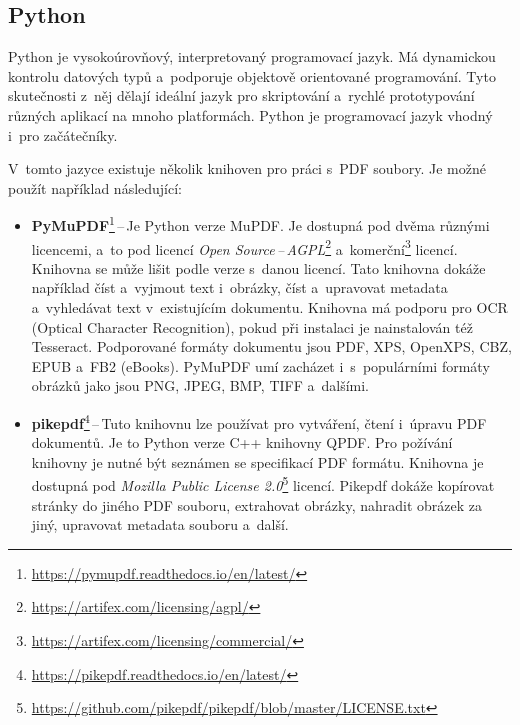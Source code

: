 \subsection*{Python}

Python je vysokoúrovňový, interpretovaný programovací jazyk. Má dynamickou
kontrolu datových typů a~podporuje objektově orientované programování. Tyto
skutečnosti z~něj dělají ideální jazyk pro skriptování a~rychlé prototypování
různých aplikací na mnoho platformách. Python je programovací jazyk vhodný i~pro
začátečníky.
\cite{Python}

V~tomto jazyce existuje několik knihoven pro práci s~PDF soubory. Je možné použít
například následující: 
\begin{itemize}
    \item \textbf{PyMuPDF}\footnote{
    \href{https://pymupdf.readthedocs.io/en/latest/}{https://pymupdf.readthedocs.io/en/latest/}
    }\,--\,Je Python verze MuPDF. Je dostupná pod dvěma různými licencemi, a~to pod
    licencí \emph{Open Source\,--\,AGPL}\footnote{
    \href{https://artifex.com/licensing/agpl/}{https://artifex.com/licensing/agpl/}
    } a~komerční\footnote{
    \href{https://artifex.com/licensing/commercial/}{https://artifex.com/licensing/commercial/}
    } licencí. Knihovna se může lišit podle verze s~danou licencí. Tato knihovna
    dokáže například číst a~vyjmout text i~obrázky, číst a~upravovat
    metadata a~vyhledávat text v~existujícím dokumentu.
    Knihovna má podporu pro OCR (Optical Character Recognition), pokud při
    instalaci je nainstalován též Tesseract. Podporované formáty dokumentu jsou
    PDF, XPS, OpenXPS, CBZ, EPUB a~FB2 (eBooks). PyMuPDF umí zacházet
    i~s~populárními formáty obrázků jako jsou PNG, JPEG, BMP, TIFF a~dalšími.

    \item \textbf{pikepdf}\footnote{
    \href{https://pikepdf.readthedocs.io/en/latest/}{https://pikepdf.readthedocs.io/en/latest/}
    }\,--\,Tuto knihovnu lze používat pro vytváření, čtení i~úpravu PDF dokumentů.
    Je to Python verze C++ knihovny QPDF. Pro požívání knihovny je nutné být
    seznámen se specifikací PDF formátu. Knihovna je dostupná pod
    \emph{Mozilla Public License 2.0}\footnote{
    \href{https://github.com/pikepdf/pikepdf/blob/master/LICENSE.txt}{https://github.com/pikepdf/pikepdf/blob/master/LICENSE.txt}
    } licencí. Pikepdf dokáže kopírovat stránky do jiného PDF souboru, extrahovat
    obrázky, nahradit obrázek za jiný, upravovat metadata souboru a~další.

\end{itemize}


